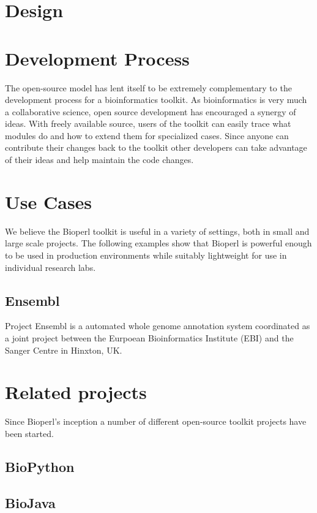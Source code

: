 \documentclass{article}
\begin{document}
\begin{twocolumn}
\section{Design}

\section{Development Process}

The open-source model has lent itself to be extremely complementary to
the development process for a bioinformatics toolkit.  As
bioinformatics is very much a collaborative science, open source
development has encouraged a synergy of ideas.  With freely available
source, users of the toolkit can easily trace what modules do and how
to extend them for specialized cases.  Since anyone can contribute
their changes back to the toolkit other developers can take advantage
of their ideas and help maintain the code changes. 

\section{Use Cases}

We believe the Bioperl toolkit is useful in a variety of settings,
both in small and large scale projects.  The following examples
show that Bioperl is powerful enough to be used in production
environments while suitably lightweight for use in individual research
labs.

\subsection{Ensembl}
Project Ensembl is a automated whole genome annotation system
coordinated as a joint project between the Eurpoean Bioinformatics
Institute (EBI) and the Sanger Centre in Hinxton, UK.    


\section{Related projects}

Since Bioperl's inception a number of different open-source toolkit
projects have been started.  

\subsection{BioPython}

\subsection{BioJava}


\end{twocolumn}
\end{document}
